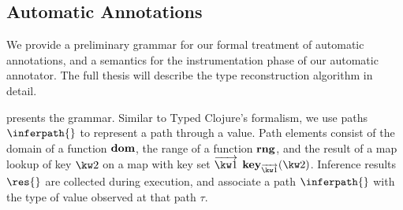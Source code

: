 \documentclass[9pt]{extarticle}
\begin{document}
%
%
%
%
%
%

\subsection{Automatic Annotations}

We provide a preliminary grammar for our formal treatment of automatic
annotations, and a semantics for the instrumentation phase
of our automatic annotator.
The full thesis will describe the type reconstruction algorithm in
detail.

 presents the grammar. Similar to Typed Clojure's
formalism, we use paths $\inferpath{}$ to represent a path through
a value. Path elements consist of the domain of a function $\textbf{dom}{}$,
the range of a function $\textbf{rng}{}$, and the result of a map lookup 
of key ${\kw2{}}$ on a map with key set ${\overrightarrow{\kw1{}}}$
$\inferkeype{\overrightarrow{\kw1{}}}{\kw2{}}$.
Inference results $\res{}$ are collected during execution, and
associate a path $\inferpath{}$ with the type of value observed
at that path $\tau$.
\end{document}
